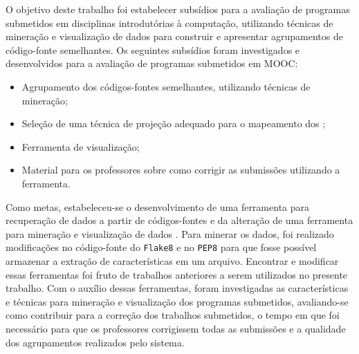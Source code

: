 %	
	
	O objetivo deste trabalho foi estabelecer subsídios para a avaliação de
	programas submetidos em disciplinas introdutórias à computação, utilizando técnicas
	de mineração e visualização de dados para construir e apresentar agrupamentos de
	código-fonte semelhantes. Os seguintes subsídios foram investigados e desenvolvidos
	para a avaliação de programas submetidos em \acs{MOOC}:  %
	\begin{itemize}
		\item Agrupamento dos códigos-fontes semelhantes, utilizando técnicas de mineração;
		\item Seleção de uma técnica de projeção adequado para o mapeamento dos ;
		\item Ferramenta de visualização;
		\item Material para os professores sobre como corrigir as submissões utilizando a ferramenta.
	\end{itemize}
	
	Como metas, estabeleceu-se
	o desenvolvimento de uma ferramenta para recuperação de dados a partir de
	códigos-fontes e da alteração de uma ferramenta para mineração e visualização de %
	dados \cite{Alencar-etal:2012}. Para minerar os dados, foi realizado modificações no
	código-fonte do \texttt{Flake8} \cite{flake8} e no \texttt{PEP8} \cite{pep8} para
	que fosse possível armazenar a extração de características em um arquivo. Encontrar
	e modificar essas ferramentas foi fruto de trabalhos anteriores a serem utilizados
	no presente trabalho. Com o auxílio dessas ferramentas, foram investigadas as
	características e técnicas para mineração e visualização dos programas submetidos,
	avaliando-se como contribuir para a correção dos trabalhos submetidos, o tempo em  %
	que foi necessário para que os professores corrigissem todas as submissões e a
	qualidade dos agrupamentos realizados pelo sistema.
	
